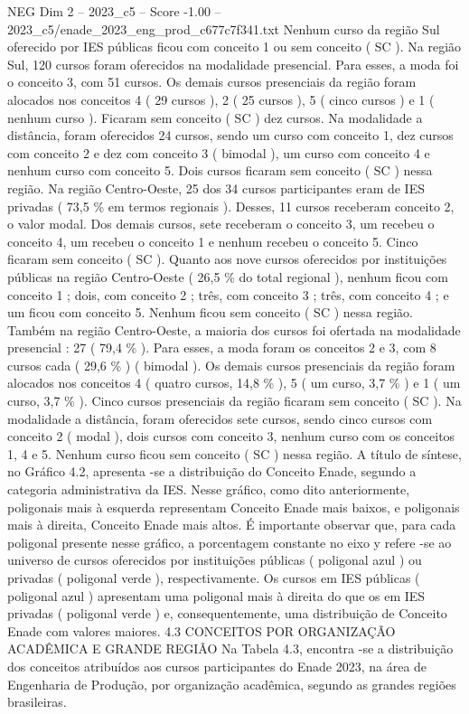 \begin{textsample}{NEG Dim 2 – 2023\_c5 – Score -1.00 – 2023\_c5/enade\_2023\_eng\_prod\_c677c7f341.txt}
Nenhum curso da região Sul oferecido por IES públicas ficou com conceito 1 ou sem conceito ( SC ).
Na região Sul, 120 cursos foram oferecidos na modalidade presencial.
Para esses, a moda foi o conceito 3, com 51 cursos.
Os demais cursos presenciais da região foram alocados nos conceitos 4 ( 29 cursos ), 2 ( 25 cursos ), 5 ( cinco cursos ) e 1 ( nenhum curso ).
Ficaram sem conceito ( SC ) dez cursos.
Na modalidade a distância, foram oferecidos 24 cursos, sendo um curso com conceito 1, dez cursos com conceito 2 e dez com conceito 3 ( bimodal ), um curso com conceito 4 e nenhum curso com conceito 5.
Dois cursos ficaram sem conceito ( SC ) nessa região.
Na região Centro-Oeste, 25 dos 34 cursos participantes eram de IES privadas ( 73,5 \% em termos regionais ).
Desses, 11 cursos receberam conceito 2, o valor modal.
Dos demais cursos, sete receberam o conceito 3, um recebeu o conceito 4, um recebeu o conceito 1 e nenhum recebeu o conceito 5.
Cinco ficaram sem conceito ( SC ).
Quanto aos nove cursos oferecidos por instituições públicas na região Centro-Oeste ( 26,5 \% do total regional ), nenhum ficou com conceito 1 ; dois, com conceito 2 ; três, com conceito 3 ; três, com conceito 4 ; e um ficou com conceito 5.
Nenhum ficou sem conceito ( SC ) nessa região.
Também na região Centro-Oeste, a maioria dos cursos foi ofertada na modalidade presencial : 27 ( 79,4 \% ).
Para esses, a moda foram os conceitos 2 e 3, com 8 cursos cada ( 29,6 \% ) ( bimodal ).
Os demais cursos presenciais da região foram alocados nos conceitos 4 ( quatro cursos, 14,8 \% ), 5 ( um curso, 3,7 \% ) e 1 ( um curso, 3,7 \% ).
Cinco cursos presenciais da região ficaram sem conceito ( SC ).
Na modalidade a distância, foram oferecidos sete cursos, sendo cinco cursos com conceito 2 ( modal ), dois cursos com conceito 3, nenhum curso com os conceitos 1, 4 e 5.
Nenhum curso ficou sem conceito ( SC ) nessa região.
A título de síntese, no Gráfico 4.2, apresenta -se a distribuição do Conceito Enade, segundo a categoria administrativa da IES.
Nesse gráfico, como dito anteriormente, poligonais mais à esquerda representam Conceito Enade mais baixos, e poligonais mais à direita, Conceito Enade mais altos.
É importante observar que, para cada poligonal presente nesse gráfico, a porcentagem constante no eixo y refere -se ao universo de cursos oferecidos por instituições públicas ( poligonal azul ) ou privadas ( poligonal verde ), respectivamente.
Os cursos em IES públicas ( poligonal azul ) apresentam uma poligonal mais à direita do que os em IES privadas ( poligonal verde ) e, consequentemente, uma distribuição de Conceito Enade com valores maiores. 4.3 CONCEITOS POR ORGANIZAÇÃO ACADÊMICA E GRANDE REGIÃO Na Tabela 4.3, encontra -se a distribuição dos conceitos atribuídos aos cursos participantes do Enade 2023, na área de Engenharia de Produção, por organização acadêmica, segundo as grandes regiões brasileiras.

\end{textsample}

